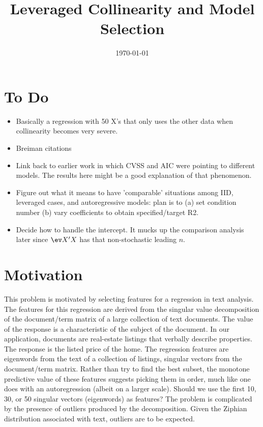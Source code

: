 \documentclass[12pt]{article}
\title{ Leveraged Collinearity and Model Selection }
\date{\today}
\begin{document}


\section{ To Do }

\begin{itemize}

 \item Basically a regression with 50 X's that only uses the other data when
 collinearity becomes very severe.

 \item Breiman citations

 \item Link back to earlier work in which CVSS and AIC were pointing to
 different models. The results here might be a good explanation of that
 phenomenon.

 \item Figure out what it means to have 'comparable' situations among IID,
 leveraged cases, and autoregressive models: plan is to (a) set condition number
 (b) vary coefficients to obtain specified/target R2.

 \item Decide how to handle the intercept. It mucks up the comparison analysis
 later since $\ev X'X$ has that non-stochastic leading $n$.

\end{itemize}


\section{ Motivation }
\label{sec:motivation}

 This problem is motivated by selecting features for a regression in text
 analysis.  The features for this regression are derived from the singular value
 decomposition of the document/term matrix of a large collection of text
 documents.  The value of the response is a characteristic of the subject of the
 document.  In our application, documents are real-estate listings that verbally
 describe properties.  The response is the listed price of the home.  The
 regression features are eigenwords from the text of a collection of listings,
 singular vectors from the document/term matrix.  Rather than try to find the
 best subset, the monotone predictive value of these features suggests picking
 them in order, much like one does with an autoregression (albeit on a larger
 scale).  Should we use the first 10, 30, or 50 singular vectors (eigenwords) as
 features?  The problem is complicated by the presence of outliers produced by
 the decomposition.  Given the Ziphian distribution associated with text,
 outliers are to be expected.
\end{document}
